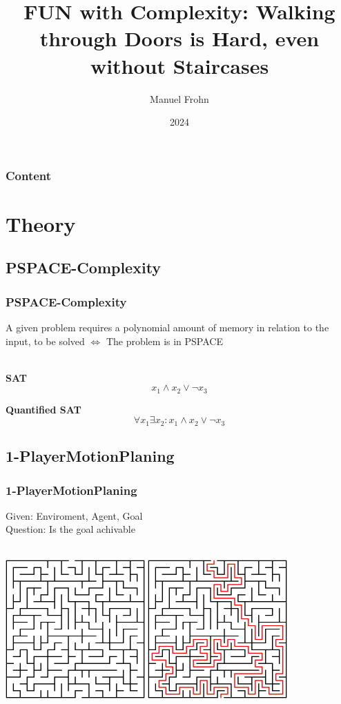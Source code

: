 \documentclass{beamer}
\title{FUN with Complexity: Walking through Doors is Hard, even without Staircases}
\author{Manuel Frohn}
\institute{RWTH Aachen}
\date{2024}
\begin{document}
\frame{\titlepage}
\begin{frame}
  \frametitle{Content}
  \tableofcontents
\end{frame}
\section{Theory}
\subsection{PSPACE-Complexity}
\begin{frame}
  \frametitle{PSPACE-Complexity}
  A given problem requires a polynomial amount of memory in relation to the
  input, to be solved $\Leftrightarrow$ The problem is in PSPACE
  \\~\\
  \begin{minipage}[t]{0.48\textwidth}
    \textbf{SAT}
    \[ x_1 \land x_2 \lor \lnot x_3 \]
  \end{minipage}
  \begin{minipage}[t]{0.48\textwidth}
    \textbf{Quantified SAT}
    \[ \forall x_1 \exists x_2 : x_1 \land x_2 \lor \lnot x_3 \]
  \end{minipage}
\end{frame}
\subsection{1-PlayerMotionPlaning}
\begin{frame}
  \frametitle{1-PlayerMotionPlaning}
  Given: Enviroment, Agent, Goal \\
  Question: Is the goal achivable
  \\~\\
  \centerline{
    \includegraphics[width=0.40\textwidth]{res/Maze.png}
    \hspace{2.5cm}
    \includegraphics[width=0.40\textwidth]{res/MazeSolved.png}
  }
\end{frame}
\end{document}
